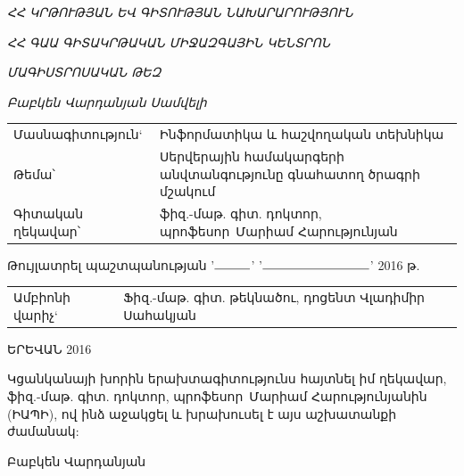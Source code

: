 \documentclass[a4paper,12pt]{article}
\author{\MYAUTHOR}
\title{\MYTITLE}
\date{2016}
\def\MYDIRECTOR{Մարիամ Հարությունյան}
\def\MYDIRECTORTITLE{ֆիզ.-մաթ. գիտ. դոկտոր, պրոֆեսոր}
\def\MYTITLE{Սերվերային համակարգերի անվտանգությունը գնահատող ծրագրի մշակում}
\begin{document}
\begin{titlepage}
	\centering
	{\LARGE
		\textit{ՀՀ ԿՐԹՈՒԹՅԱՆ ԵՎ ԳԻՏՈՒԹՅԱՆ ՆԱԽԱՐԱՐՈՒԹՅՈՒՆ} \par
		\textit{ՀՀ ԳԱԱ ԳԻՏԱԿՐԹԱԿԱՆ ՄԻՋԱԶԳԱՅԻՆ ԿԵՆՏՐՈՆ} \par
		\textit{ՄԱԳԻՍՏՐՈՍԱԿԱՆ ԹԵԶ} \par
		\textit{Բաբկեն Վարդանյան Սամվելի} \par
	}

	\vspace{2.5cm}

	\raggedright
	{\Large
		\begin{tabularx}{\textwidth}{ p{6.5cm} X }
		Մասնագիտություն` & Ինֆորմատիկա և հաշվողական տեխնիկա \\
		Թեմա՝ & \MYTITLE \\
		Գիտական ղեկավար՝ & \MYDIRECTORTITLE \ \MYDIRECTOR \\
		\end{tabularx}
	}

	\vspace{2cm}

	{\Large Թույլատրել պաշտպանության '$\rule{1cm}{0.15mm}$' '$\rule{3cm}{0.15mm}$' 2016 թ. \par}

	\vspace{2cm}
	{\Large
	}
	{\Large
		\begin{tabularx}{\textwidth}{ p{6.5cm} X }
		Ամբիոնի վարիչ` & Ֆիզ.-մաթ. գիտ. թեկնածու, դոցենտ Վլադիմիր Սահակյան \\
		\end{tabularx}
	}

	\centering
	\vfill
	{\Large ԵՐԵՎԱՆ 2016\par}
\end{titlepage}
\newpage

\setcounter{page}{2}

Կցանկանայի խորին երախտագիտությունս հայտնել իմ ղեկավար, \MYDIRECTORTITLE \
\MYDIRECTOR ին (ԻԱՊԻ), ով ինձ աջակցել և խրախուսել է այս աշխատանքի
ժամանակ:

\hfill \hfill Բաբկեն Վարդանյան

\newpage

\tableofcontents
\end{document}
